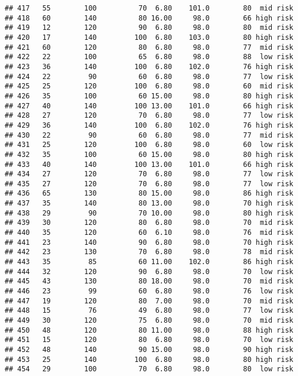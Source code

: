 \documentclass[
  ignorenonframetext,
]{beamer}
\begin{document}
\begin{frame}[fragile]
\begin{verbatim}
## 417   55        100          70  6.80    101.0        80  mid risk
## 418   60        140          80 16.00     98.0        66 high risk
## 419   12        120          90  6.80     98.0        80  mid risk
## 420   17        140         100  6.80    103.0        80 high risk
## 421   60        120          80  6.80     98.0        77  mid risk
## 422   22        100          65  6.80     98.0        88  low risk
## 423   36        140         100  6.80    102.0        76 high risk
## 424   22         90          60  6.80     98.0        77  low risk
## 425   25        120         100  6.80     98.0        60  mid risk
## 426   35        100          60 15.00     98.0        80 high risk
## 427   40        140         100 13.00    101.0        66 high risk
## 428   27        120          70  6.80     98.0        77  low risk
## 429   36        140         100  6.80    102.0        76 high risk
## 430   22         90          60  6.80     98.0        77  mid risk
## 431   25        120         100  6.80     98.0        60  low risk
## 432   35        100          60 15.00     98.0        80 high risk
## 433   40        140         100 13.00    101.0        66 high risk
## 434   27        120          70  6.80     98.0        77  low risk
## 435   27        120          70  6.80     98.0        77  low risk
## 436   65        130          80 15.00     98.0        86 high risk
## 437   35        140          80 13.00     98.0        70 high risk
## 438   29         90          70 10.00     98.0        80 high risk
## 439   30        120          80  6.80     98.0        70  mid risk
## 440   35        120          60  6.10     98.0        76  mid risk
## 441   23        140          90  6.80     98.0        70 high risk
## 442   23        130          70  6.80     98.0        78  mid risk
## 443   35         85          60 11.00    102.0        86 high risk
## 444   32        120          90  6.80     98.0        70  low risk
## 445   43        130          80 18.00     98.0        70  mid risk
## 446   23         99          60  6.80     98.0        76  low risk
## 447   19        120          80  7.00     98.0        70  mid risk
## 448   15         76          49  6.80     98.0        77  low risk
## 449   30        120          75  6.80     98.0        70  mid risk
## 450   48        120          80 11.00     98.0        88 high risk
## 451   15        120          80  6.80     98.0        70  low risk
## 452   48        140          90 15.00     98.0        90 high risk
## 453   25        140         100  6.80     98.0        80 high risk
## 454   29        100          70  6.80     98.0        80  low risk

\end{verbatim}
\end{frame}
\end{document}
